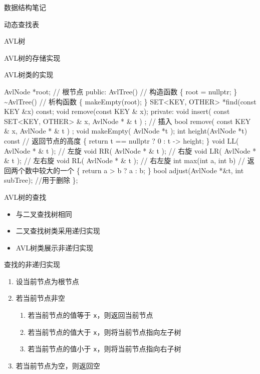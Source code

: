 \documentclass[
  ignorenonframetext,
]{beamer}
\newenvironment{Shaded}{}{}
\newcommand{\NormalTok}[1]{#1}
\providecommand{\tightlist}{%
  \setlength{\itemsep}{0pt}\setlength{\parskip}{0pt}}
\begin{document}
\begin{frame}[fragile]{数据结构笔记}
\begin{block}{动态查找表}
\begin{block}{AVL树}
\begin{block}{AVL树的存储实现}
\begin{block}{AVL树类的实现}
\begin{Shaded}
\begin{Highlighting}[]
\NormalTok{    AvlNode *root; // 根节点}
\NormalTok{  public:}
\NormalTok{    AvlTree() // 构造函数}
\NormalTok{    \{}
\NormalTok{      root = nullptr;}
\NormalTok{    \}}
\NormalTok{    \textasciitilde{}AvlTree() // 析构函数}
\NormalTok{    \{}
\NormalTok{      makeEmpty(root);}
\NormalTok{    \}}
\NormalTok{    SET\textless{}KEY, OTHER\textgreater{} *find(const KEY \&x) const;}
\NormalTok{    void remove(const KEY \& x);}
\NormalTok{  private:}
\NormalTok{    void insert( const SET\textless{}KEY, OTHER\textgreater{} \& x, AvlNode * \& t ) ; // 插入}
\NormalTok{    bool remove( const KEY \& x, AvlNode * \& t ) ;}
\NormalTok{    void makeEmpty( AvlNode *t );}
\NormalTok{    int height(AvlNode *t) const  // 返回节点的高度}
\NormalTok{    \{}
\NormalTok{      return t == nullptr ? 0 : t {-}\textgreater{} height;}
\NormalTok{    \}}
\NormalTok{    void LL( AvlNode * \& t ); // 左旋}
\NormalTok{    void RR( AvlNode * \& t ); // 右旋}
\NormalTok{    void LR( AvlNode * \& t ); // 左右旋}
\NormalTok{    void RL( AvlNode * \& t ); // 右左旋}
\NormalTok{    int max(int a, int b)     // 返回两个数中较大的一个}
\NormalTok{    \{}
\NormalTok{      return a \textgreater{} b ? a : b;}
\NormalTok{    \}}
\NormalTok{    bool adjust(AvlNode *\&t, int subTree); //用于删除}
\NormalTok{\};  }
\end{Highlighting}
\end{Shaded}
\end{block}
\end{block}

\begin{block}{AVL树的查找}
\protect{}\label{avlux6811ux7684ux67e5ux627e}
\begin{itemize}
\tightlist
\item
  与二叉查找树相同
\item
  二叉查找树类采用递归实现
\item
  AVL树类展示非递归实现
\end{itemize}

\begin{block}{查找的非递归实现}
\protect{}\label{ux67e5ux627eux7684ux975eux9012ux5f52ux5b9eux73b0}
\begin{enumerate}
\tightlist
\item
  设当前节点为根节点
\item
  若当前节点非空

  \begin{enumerate}
  \tightlist
  \item
    若当前节点的值等于 \texttt{x}，则返回当前节点
  \item
    若当前节点的值大于 \texttt{x}，则将当前节点指向左子树
  \item
    若当前节点的值小于 \texttt{x}，则将当前节点指向右子树
  \end{enumerate}
\item
  若当前节点为空，则返回空
\end{enumerate}


\end{block}
\end{block}
\end{block}
\end{block}
\end{frame}
\end{document}
